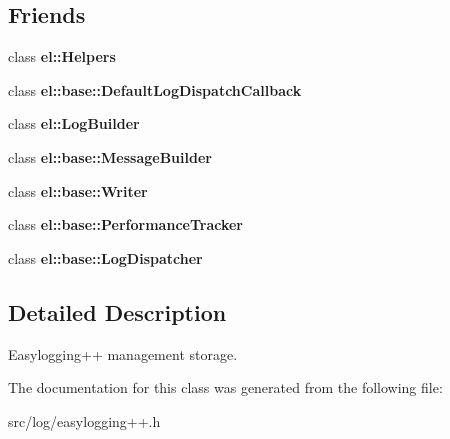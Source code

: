 \subsection*{Friends}
\begin{DoxyCompactItemize}
\item 
class {\bfseries el\+::\+Helpers}\hypertarget{classel_1_1base_1_1Storage_a2fb8a2c02cbf86247f093c118bed877a}{}\label{classel_1_1base_1_1Storage_a2fb8a2c02cbf86247f093c118bed877a}

\item 
class {\bfseries el\+::base\+::\+Default\+Log\+Dispatch\+Callback}\hypertarget{classel_1_1base_1_1Storage_a42b1de96d584ae4fecbfc2b9aff95052}{}\label{classel_1_1base_1_1Storage_a42b1de96d584ae4fecbfc2b9aff95052}

\item 
class {\bfseries el\+::\+Log\+Builder}\hypertarget{classel_1_1base_1_1Storage_a8c584bcf767a4d007311a7408b22ad62}{}\label{classel_1_1base_1_1Storage_a8c584bcf767a4d007311a7408b22ad62}

\item 
class {\bfseries el\+::base\+::\+Message\+Builder}\hypertarget{classel_1_1base_1_1Storage_a81bbf6fe31fab133d182efa8367304f1}{}\label{classel_1_1base_1_1Storage_a81bbf6fe31fab133d182efa8367304f1}

\item 
class {\bfseries el\+::base\+::\+Writer}\hypertarget{classel_1_1base_1_1Storage_a7a728edbb2761d151832daa74d5b2736}{}\label{classel_1_1base_1_1Storage_a7a728edbb2761d151832daa74d5b2736}

\item 
class {\bfseries el\+::base\+::\+Performance\+Tracker}\hypertarget{classel_1_1base_1_1Storage_a6a4d7851e1984800be3c230f06a79528}{}\label{classel_1_1base_1_1Storage_a6a4d7851e1984800be3c230f06a79528}

\item 
class {\bfseries el\+::base\+::\+Log\+Dispatcher}\hypertarget{classel_1_1base_1_1Storage_a9b37b28ea1c5f8f862cc89f135711d92}{}\label{classel_1_1base_1_1Storage_a9b37b28ea1c5f8f862cc89f135711d92}

\end{DoxyCompactItemize}


\subsection{Detailed Description}
Easylogging++ management storage. 

The documentation for this class was generated from the following file\+:\begin{DoxyCompactItemize}
\item 
src/log/easylogging++.\+h\end{DoxyCompactItemize}
